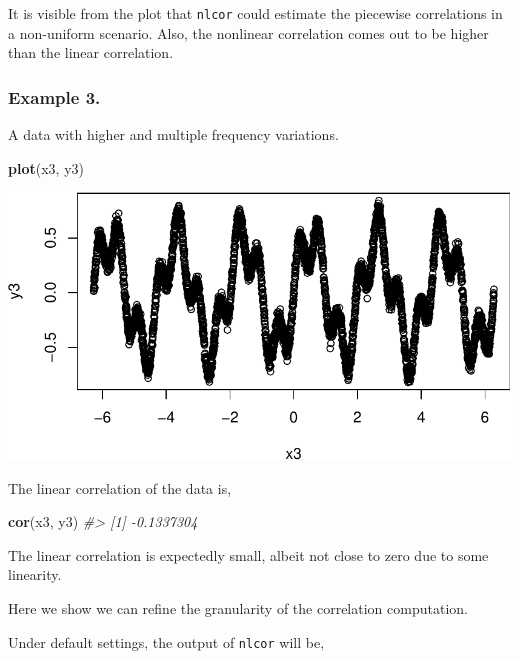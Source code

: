 \documentclass[]{article}
\newenvironment{Shaded}{\begin{snugshade}}{\end{snugshade}}
\newcommand{\CommentTok}[1]{\textcolor[rgb]{0.56,0.35,0.01}{\textit{#1}}}
\newcommand{\DataTypeTok}[1]{\textcolor[rgb]{0.13,0.29,0.53}{#1}}
\newcommand{\KeywordTok}[1]{\textcolor[rgb]{0.13,0.29,0.53}{\textbf{#1}}}
\newcommand{\NormalTok}[1]{#1}
\newcommand{\OperatorTok}[1]{\textcolor[rgb]{0.81,0.36,0.00}{\textbf{#1}}}
\newcommand{\StringTok}[1]{\textcolor[rgb]{0.31,0.60,0.02}{#1}}
\begin{document}
It is visible from the plot that \texttt{nlcor} could estimate the
piecewise correlations in a non-uniform scenario. Also, the nonlinear
correlation comes out to be higher than the linear correlation.

\hypertarget{example-3.}{%
\subsubsection{Example 3.}\label{example-3.}}

A data with higher and multiple frequency variations.

\begin{Shaded}
\begin{Highlighting}[]
\KeywordTok{plot}\NormalTok{(x3, y3)}
\end{Highlighting}
\end{Shaded}

\begin{center}\includegraphics{README_files/figure-latex/Figure-3.1-1} \end{center}

The linear correlation of the data is,

\begin{Shaded}
\begin{Highlighting}[]
\KeywordTok{cor}\NormalTok{(x3, y3)}
\CommentTok{#> [1] -0.1337304}
\end{Highlighting}
\end{Shaded}

The linear correlation is expectedly small, albeit not close to zero due
to some linearity.

Here we show we can refine the granularity of the correlation
computation.

Under default settings, the output of \texttt{nlcor} will be,

\begin{Shaded}
\end{Shaded}
\end{document}
